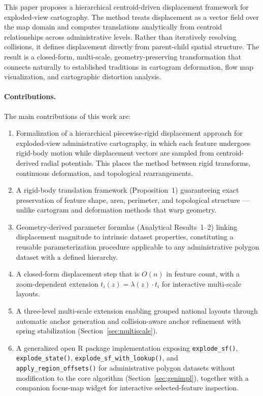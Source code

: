 \documentclass[12pt, a4paper]{article}
\numberwithin{equation}{section}
\begin{document}
This paper proposes a hierarchical centroid-driven displacement framework for exploded-view cartography. The method treats displacement as a vector field over the map domain and computes translations analytically from centroid relationships across administrative levels. Rather than iteratively resolving collisions, it defines displacement directly from parent-child spatial structure. The result is a closed-form, multi-scale, geometry-preserving transformation that connects naturally to established traditions in cartogram deformation, flow map visualization, and cartographic distortion analysis.

\paragraph{Contributions.} The main contributions of this work are:
\begin{enumerate}
  \item Formalization of a hierarchical piecewise-rigid displacement approach for exploded-view administrative cartography, in which each feature undergoes rigid-body motion while displacement vectors are sampled from centroid-derived radial potentials. This places the method between rigid transforms, continuous deformation, and topological rearrangements.
  \item A rigid-body translation framework (Proposition~1) guaranteeing exact preservation of feature shape, area, perimeter, and topological structure --- unlike cartogram and deformation methods that warp geometry.
  \item Geometry-derived parameter formulas (Analytical Results~1--2) linking displacement magnitude to intrinsic dataset properties, constituting a reusable parameterization procedure applicable to any administrative polygon dataset with a defined hierarchy.
  \item A closed-form displacement step that is $O(n)$ in feature count, with a zoom-dependent extension $t_i(z) = \lambda(z)\cdot t_i$ for interactive multi-scale layouts.
  \item A three-level multi-scale extension enabling grouped national layouts through automatic anchor generation and collision-aware anchor refinement with spring stabilization (Section~\ref{sec:multiscale}).
  \item A generalized open \textsf{R} package implementation exposing \texttt{explode\_sf()}, \texttt{explode\_state()}, \texttt{explode\_sf\_with\_lookup()}, and \texttt{apply\_region\_offsets()} for administrative polygon datasets without modification to the core algorithm (Section~\ref{sec:genimpl}), together with a companion focus-map widget for interactive selected-feature inspection.
\end{enumerate}
\end{document}
